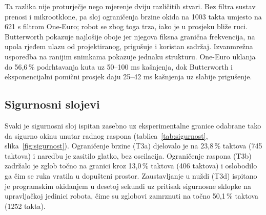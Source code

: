 \begin{table}[H]
  \caption{Filtri na stvarnom robotu (T2a--T2d) uz parametre One-Euro
  $f_{c,\min}=1{,}0$ Hz i $\beta=0{,}007$; Butterworth 2.~reda $f_c=6$ Hz;
  eksponencijalni pomični prosjek $\alpha=0{,}2$.
  $\overline{\text{RMSE}}_\text{p}$ je srednja pogreška po šest zglobova nakon
  uklanjanja faznog pomaka, a stupac ograničenja brzine broj taktova u kojima je
  sloj djelovao. Rang je kvalitativna ocjena dvaju sudionika i stoji uz objektivne
  stupce kao njihova dopuna, ne kao mjerena veličina.}
  \label{tab:filtri}
  \centering\small
  
\end{table}

Ta razlika nije proturječje nego mjerenje dviju različitih stvari. Bez filtra
sustav prenosi i mikrootklone, pa sloj ograničenja brzine okida na 1003 takta
umjesto na 621 s filtrom One-Euro; robot se zbog toga trza, iako je u prosjeku
bliže ruci. Butterworth pokazuje najlošije oboje jer njegova fiksna granična
frekvencija, na upola rjeđem ulazu od projektiranog, prigušuje i koristan
sadržaj. Izvanmrežna usporedba na ranijim snimkama pokazuje jednaku strukturu.
One-Euro uklanja do 56,6\,\% podrhtavanja kuta uz 50--100 ms kašnjenja, dok
Butterworth i eksponencijalni pomični prosjek daju 25--42 ms kašnjenja uz
slabije prigušenje.

\subsection{Sigurnosni slojevi}

Svaki je sigurnosni sloj ispitan zasebno uz eksperimentalne granice odabrane tako da sigurno okinu unutar radnog raspona (tablica~\ref{tab:sigurnost}, slika~\ref{fig:sigurnost}). Ograničenje brzine (T3a) djelovalo je na 23,8\,\% taktova (745 taktova) i naredbu je zasitilo glatko, bez oscilacija. Ograničenje raspona (T3b) zadržalo je zglob točno na granici kroz 13,0\,\% taktova (406 taktova) i oslobodilo ga čim se ruka vratila u dopušteni prostor. Zaustavljanje u nuždi (T3d) ispitano je programskim okidanjem u desetoj sekundi uz pritisak sigurnosne sklopke na upravljačkoj jedinici robota, čime su zglobovi zamrznuti na točno 50,1\,\% taktova (1252 takta).

\begin{table}[H]
  \caption{Sigurnosni slojevi sa zadanim granicama i udjelima taktova u kojima je pojedini sloj djelovao.}
  \label{tab:sigurnost}
  \centering\small
  
\end{table}

